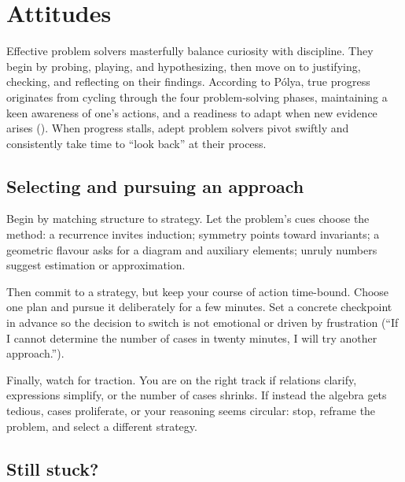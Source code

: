 \documentclass[
  a4paper,
  DIV=11,
  numbers=noendperiod,
  oneside]{scrreprt}
\begin{document}
\chapter{Attitudes}\label{sec-attitudes}

Effective problem solvers masterfully balance curiosity with discipline.
They begin by probing, playing, and hypothesizing, then move on to
justifying, checking, and reflecting on their findings. According to
Pólya, true progress originates from cycling through the four
problem-solving phases, maintaining a keen awareness of one's actions,
and a readiness to adapt when new evidence arises
(). When progress stalls, adept
problem solvers pivot swiftly and consistently take time to ``look
back'' at their process.

\section{Selecting and pursuing an
approach}\label{selecting-and-pursuing-an-approach}

Begin by matching structure to strategy. Let the problem's cues choose
the method: a recurrence invites induction; symmetry points toward
invariants; a geometric flavour asks for a diagram and auxiliary
elements; unruly numbers suggest estimation or approximation.

Then commit to a strategy, but keep your course of action time-bound.
Choose one plan and pursue it deliberately for a few minutes. Set a
concrete checkpoint in advance so the decision to switch is not
emotional or driven by frustration (``If I cannot determine the number
of cases in twenty minutes, I will try another approach.'').

Finally, watch for traction. You are on the right track if relations
clarify, expressions simplify, or the number of cases shrinks. If
instead the algebra gets tedious, cases proliferate, or your reasoning
seems circular: stop, reframe the problem, and select a different
strategy.

\section{Still stuck?}\label{still-stuck}
\end{document}
